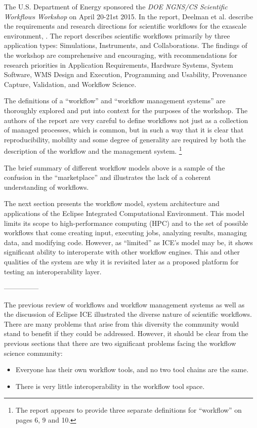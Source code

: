 The U.S. Department of Energy sponsored the \emph{DOE NGNS/CS Scientific
Workflows Workshop} on April 20-21st 2015. In the report, Deelman et al.
describe the requirements and research directions for scientific
workflows for the exascale environment, \cite{deelman_future_2015}. The report
describes scientific workflows primarily by three application types:
Simulations, Instruments, and Collaborations. The findings of the workshop are
comprehensive and encouraging, with recommendations for research
priorities in Application Requirements, Hardware Systems, System
Software, WMS Design and Execution, Programming and Usability,
Provenance Capture, Validation, and Workflow Science.

The definitions of a ``workflow'' and ``workflow management systems''
are thoroughly explored and put into context for the purposes of the
workshop. The authors of the report are very careful to define workflows
not just as a collection of managed processes, which is common, but in
such a way that it is clear that reproducibility, mobility and some
degree of generality are required by both the description of the
workflow and the management system. \footnote{The report appears to provide
three separate definitions for ``workflow'' on pages 6, 9 and 10.}

The brief summary of different workflow models above is a sample of the
confusion in the ``marketplace'' and illustrates the lack of a coherent
understanding of workflows.

The next section presents the workflow model, system architecture and
applications of the Eclipse Integrated Computational Environment. This
model limits its scope to high-performance computing (HPC) and to the
set of possible workflows that come creating input, executing jobs,
analyzing results, managing data, and modifying code. However, as ``limited'' as
ICE's model may be, it shows significant ability to interoperate with
other workflow engines. This and other qualities of the system are why
it is revisited later as a proposed platform for testing an
interoperability layer.

---------------

The previous review of workflows and workflow management systems as well as the
discussion of Eclipse ICE illustrated the diverse nature of scientific
workflows. There are many problems that arise from this diversity the community
would stand to benefit if they could be addressed. However, it should be clear
from the previous sections that there are two significant problems facing the workflow science community:
\begin{itemize}
  \item Everyone has their own workflow tools, and
no two tool chains are the same.
  \item There is very little interoperability in the workflow tool space.
\end{itemize}

